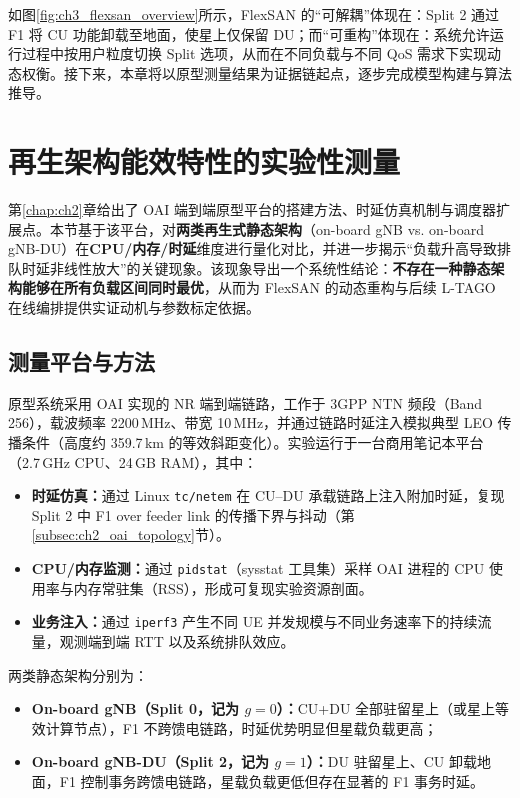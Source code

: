 \documentclass[type=master]{fduthesis}
\begin{document}
如图\ref{fig:ch3_flexsan_overview}所示，FlexSAN 的“可解耦”体现在：Split 2 通过 F1 将 CU 功能卸载至地面，使星上仅保留 DU；而“可重构”体现在：系统允许运行过程中按用户粒度切换 Split 选项，从而在不同负载与不同 QoS 需求下实现动态权衡。接下来，本章将以原型测量结果为证据链起点，逐步完成模型构建与算法推导。

\section{再生架构能效特性的实验性测量}
\label{sec:ch3_measurement}

第\ref{chap:ch2}章给出了 OAI 端到端原型平台的搭建方法、时延仿真机制与调度器扩展点。本节基于该平台，对\textbf{两类再生式静态架构}（on-board gNB vs. on-board gNB-DU）在\textbf{CPU/内存/时延}维度进行量化对比，并进一步揭示“负载升高导致排队时延非线性放大”的关键现象。该现象导出一个系统性结论：\textbf{不存在一种静态架构能够在所有负载区间同时最优}，从而为 FlexSAN 的动态重构与后续 L-TAGO 在线编排提供实证动机与参数标定依据。

\subsection{测量平台与方法}
\label{subsec:ch3_measurement_setup}

原型系统采用 OAI 实现的 NR 端到端链路，工作于 3GPP NTN 频段（Band 256），载波频率 2200\,MHz、带宽 10\,MHz，并通过链路时延注入模拟典型 LEO 传播条件（高度约 359.7\,km 的等效斜距变化）。实验运行于一台商用笔记本平台（2.7\,GHz CPU、24\,GB RAM），其中：
\begin{itemize}
  \item \textbf{时延仿真：}通过 Linux \texttt{tc/netem} 在 CU--DU 承载链路上注入附加时延，复现 Split 2 中 F1 over feeder link 的传播下界与抖动（第\ref{subsec:ch2_oai_topology}节）。
  \item \textbf{CPU/内存监测：}通过 \texttt{pidstat}（sysstat 工具集）采样 OAI 进程的 CPU 使用率与内存常驻集（RSS），形成可复现实验资源剖面。
  \item \textbf{业务注入：}通过 \texttt{iperf3} 产生不同 UE 并发规模与不同业务速率下的持续流量，观测端到端 RTT 以及系统排队效应。
\end{itemize}

两类静态架构分别为：
\begin{itemize}
  \item \textbf{On-board gNB（Split 0，记为 $g=0$）：}CU+DU 全部驻留星上（或星上等效计算节点），F1 不跨馈电链路，时延优势明显但星载负载更高；
  \item \textbf{On-board gNB-DU（Split 2，记为 $g=1$）：}DU 驻留星上、CU 卸载地面，F1 控制事务跨馈电链路，星载负载更低但存在显著的 F1 事务时延。
\end{itemize}
\end{document}
